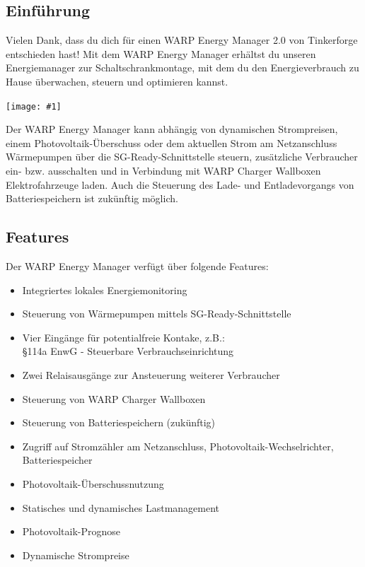\documentclass[a4paper,10pt]{article}
\newcommand{\gfx}[1]{\texttt{[image: \#1]}}
\begin{document}
\begin{multicols*}{2}
	\tableofcontents
	\newpage
	\section{Einführung}
	Vielen Dank, dass du dich für einen WARP Energy Manager 2.0 von Tinkerforge entschieden hast!
	Mit dem WARP Energy Manager
	erhältst du unseren Energiemanager zur Schaltschrankmontage, mit dem du den
	Energieverbrauch zu Hause überwachen, steuern und optimieren kannst.

	\gfx{./img_v2/energymanager_2_face_side_ready.png}

	Der WARP Energy Manager kann abhängig von dynamischen Strompreisen, einem Photovoltaik-Überschuss oder dem aktuellen Strom am Netzanschluss
    Wärmepumpen über die SG-Ready-Schnittstelle steuern, zusätzliche Verbraucher ein- bzw. ausschalten und in Verbindung mit WARP Charger Wallboxen
    Elektrofahrzeuge laden. Auch die Steuerung des Lade- und Entladevorgangs von Batteriespeichern ist zukünftig möglich.

	\subsection{Features}
	Der WARP Energy Manager verfügt über folgende Features:

    \begin{itemize}
        \item Integriertes lokales Energiemonitoring
        \item Steuerung von Wärmepumpen mittels SG-Ready-Schnittstelle
        \item Vier Eingänge für potentialfreie Kontake, z.B.:\\ \S114a EnwG - Steuerbare Verbrauchseinrichtung
        \item Zwei Relaisausgänge zur Ansteuerung weiterer Verbraucher
        \item Steuerung von WARP Charger Wallboxen
		\item Steuerung von Batteriespeichern (zukünftig)
        \item Zugriff auf Stromzähler am Netzanschluss, Photovoltaik-Wechselrichter, Batteriespeicher
        \item Photovoltaik-Überschussnutzung
        \item Statisches und dynamisches Lastmanagement
        \item Photovoltaik-Prognose
        \item Dynamische Strompreise
    \end{itemize}


\end{multicols*}
\end{document}
